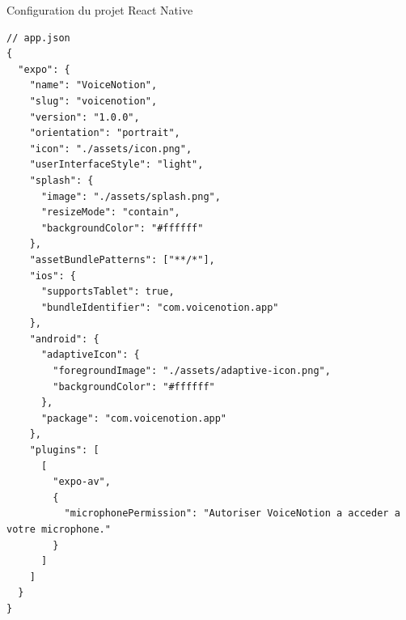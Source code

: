 \begin{codebox}{Configuration du projet React Native}
\begin{lstlisting}
// app.json
{
  "expo": {
    "name": "VoiceNotion",
    "slug": "voicenotion",
    "version": "1.0.0",
    "orientation": "portrait",
    "icon": "./assets/icon.png",
    "userInterfaceStyle": "light",
    "splash": {
      "image": "./assets/splash.png",
      "resizeMode": "contain",
      "backgroundColor": "#ffffff"
    },
    "assetBundlePatterns": ["**/*"],
    "ios": {
      "supportsTablet": true,
      "bundleIdentifier": "com.voicenotion.app"
    },
    "android": {
      "adaptiveIcon": {
        "foregroundImage": "./assets/adaptive-icon.png",
        "backgroundColor": "#ffffff"
      },
      "package": "com.voicenotion.app"
    },
    "plugins": [
      [
        "expo-av",
        {
          "microphonePermission": "Autoriser VoiceNotion a acceder a votre microphone."
        }
      ]
    ]
  }
}
\end{lstlisting}
\end{codebox}

